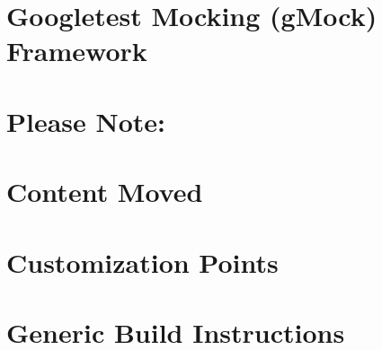 \documentclass[twoside]{book}
\newcommand{\+}{\discretionary{\mbox{\scriptsize$\hookleftarrow$}}{}{}}
\begin{document}
\chapter{Googletest Mocking (g\+Mock) Framework}
\label{md___users_peterjanku__sources_cpp__kilobot_arena_external_googletest_googlemock__r_e_a_d_m_e}

\chapter{Please Note\+:}
\label{md___users_peterjanku__sources_cpp__kilobot_arena_external_googletest_googlemock_scripts__r_e_a_d_m_e}

\chapter{Content Moved}
\label{md___users_peterjanku__sources_cpp__kilobot_arena_external_googletest_googletest_docs__r_e_a_d_m_e}

\chapter{Customization Points}
\label{md___users_peterjanku__sources_cpp__kilobot_arena_external_googletest_googletest_include_gtest_internal_custom__r_e_a_d_m_e}

\chapter{Generic Build Instructions}
\label{md___users_peterjanku__sources_cpp__kilobot_arena_external_googletest_googletest__r_e_a_d_m_e}

\end{document}
